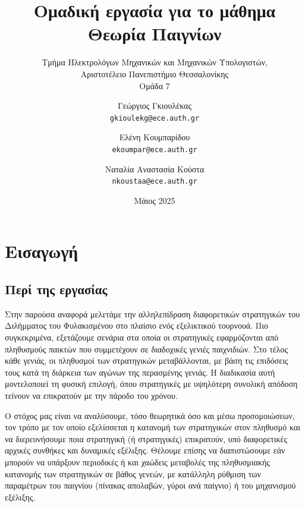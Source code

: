 \documentclass[12pt]{report}
\title{Ομαδική εργασία για το μάθημα Θεωρία Παιγνίων}
\subtitle{Τμήμα Ηλεκτρολόγων Μηχανικών και Μηχανικών Υπολογιστών,\\ Αριστοτέλειο Πανεπιστήμιο Θεσσαλονίκης \\ Ομάδα 7}
\author{
  Γεώργιος Γκιουλέκας \\ \texttt{\foreignlanguage{english}{gkioulekg@ece.auth.gr}} \and
  Ελένη Κουμπαρίδου \\ \texttt{\foreignlanguage{english}{ekoumpar@ece.auth.gr}} \and
  Ναταλία Αναστασία Κούστα \\ \texttt{\foreignlanguage{english}{nkoustaa@ece.auth.gr}}
}
\date{Μάιος 2025}
\begin{document}
\maketitle

\chapter{Εισαγωγή}
\section{Περί της εργασίας}
Στην παρούσα αναφορά μελετάμε την αλληλεπίδραση διαφορετικών στρατηγικών του Διλήμματος του Φυλακισμένου στο πλαίσιο ενός εξελικτικού τουρνουά. Πιο συγκεκριμένα, εξετάζουμε σενάρια στα οποία οι στρατηγικές εφαρμόζονται από πληθυσμούς παικτών που συμμετέχουν σε διαδοχικές γενιές παιχνιδιών. Στο τέλος κάθε γενιάς, οι πληθυσμοί των στρατηγικών μεταβάλλονται, με βάση τις επιδόσεις τους κατά τη διάρκεια των αγώνων της περασμένης γενιάς. Η διαδικασία αυτή μοντελοποιεί τη φυσική επιλογή, όπου στρατηγικές με υψηλότερη συνολική απόδοση τείνουν να επικρατούν με την πάροδο του χρόνου.

Ο στόχος μας είναι να αναλύσουμε, τόσο θεωρητικά όσο και μέσω προσομοιώσεων, τον τρόπο με τον οποίο εξελίσσεται η κατανομή των στρατηγικών στον πληθυσμό και να διερευνήσουμε ποια στρατηγική (ή στρατηγικές) επικρατούν, υπό διαφορετικές αρχικές συνθήκες και δυναμικές εξέλιξης. Θέλουμε επίσης να διαπιστώσουμε εάν μπορούν να υπάρξουν περιοδικές ή και χαώδεις μεταβολές της πληθυσμιακής κατανομής των στρατηγικών σε βάθος γενεών, με κατάλληλη ρύθμιση των παραμέτρων του παιγνίου (πίνακας απολαβών, γύροι ανά παίγνιο) ή του μηχανισμού εξέλιξης.
\end{document}
